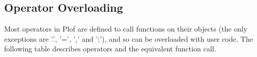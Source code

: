 \subsection{Operator Overloading}

Most operators in Plof are defined to call functions on their objects (the only exceptions are '.', '=', ',' and ';'), and so can be overloaded with user code. The following table describes operators and the equivalent function call.



\begin{comment}
<table border="0" cellspacing="0" cellpadding="0" class="Table5"><colgroup><col width="384"/><col width="384"/></colgroup><tr><td style="text-align:left;width:3.4625in; " class="Table5_A1"><p class="P25">Operator

</td><td style="text-align:left;width:3.4625in; " class="Table5_B1"><p class="P25">Function Call

</td></tr><tr><td style="text-align:left;width:3.4625in; " class="Table5_A2"><p class="P24">x || y

</td><td style="text-align:left;width:3.4625in; " class="Table5_B2"><p class="P24">x.opOr(y)

</td></tr><tr><td style="text-align:left;width:3.4625in; " class="Table5_A3"><p class="P24">x &amp;&amp; y

</td><td style="text-align:left;width:3.4625in; " class="Table5_B3"><p class="P24">x.opAnd(y)

</td></tr><tr><td style="text-align:left;width:3.4625in; " class="Table5_A3"><p class="P24">x == y

</td><td style="text-align:left;width:3.4625in; " class="Table5_B3"><p class="P24">x.opEqual(y)

</td></tr><tr><td style="text-align:left;width:3.4625in; " class="Table5_A3"><p class="P24">x != y

</td><td style="text-align:left;width:3.4625in; " class="Table5_B3"><p class="P24">x.opNotEqual(y)

</td></tr><tr><td style="text-align:left;width:3.4625in; " class="Table5_A3"><p class="P24">x &lt; y

</td><td style="text-align:left;width:3.4625in; " class="Table5_B3"><p class="P24">x.opLess(y)

</td></tr><tr><td style="text-align:left;width:3.4625in; " class="Table5_A3"><p class="P24">x &lt;= y

</td><td style="text-align:left;width:3.4625in; " class="Table5_B3"><p class="P24">x.opLessEqual(y)


\end{comment}

